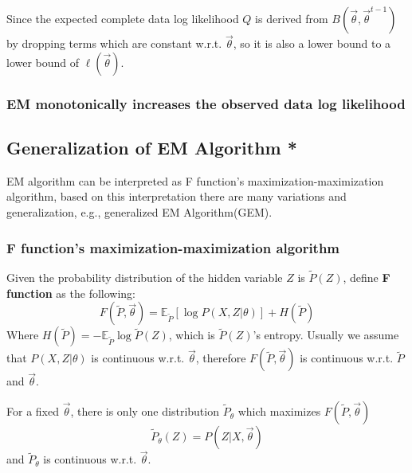 Since the expected complete data log likelihood $Q$ is derived from $B(\vec{\theta},\vec{\theta}^{t-1})$ by dropping terms which are constant w.r.t. $\vec{\theta}$, so it is also a lower bound to a lower bound of $\ell(\vec{\theta})$.


\subsubsection{EM monotonically increases the observed data log likelihood}


\subsection{Generalization of EM Algorithm *}
EM algorithm can be interpreted as F function's maximization-maximization algorithm, based on this interpretation there are many variations and generalization, e.g., generalized EM Algorithm(GEM).


\subsubsection{F function's maximization-maximization algorithm}
\begin{definition}
Given the probability distribution of the hidden variable $Z$ is $\tilde{P}(Z)$, define \textbf{F function} as the following:
\begin{equation}
F(\tilde{P},\vec{\theta})=\mathbb{E}_{\tilde{P}}\left[\log{P(X,Z|\theta)}\right]+H(\tilde{P})
\end{equation}
Where $H(\tilde{P})=-\mathbb{E}_{\tilde{P}}\log\tilde{P}(Z)$, which is $\tilde{P}(Z)$'s entropy. Usually we assume that $P(X,Z|\theta)$ is continuous w.r.t. $\vec{\theta}$, therefore $F(\tilde{P},\vec{\theta})$ is continuous w.r.t. $\tilde{P}$ and $\vec{\theta}$.
\end{definition}

\begin{lemma}
\label{lemma:F-function}
For a fixed $\vec{\theta}$, there is only one distribution $\tilde{P}_{\theta}$ which maximizes $F(\tilde{P},\vec{\theta})$
\begin{equation}
\tilde{P}_{\theta}(Z)=P(Z|X, \vec{\theta})
\end{equation}
and $\tilde{P}_{\theta}$ is continuous w.r.t. $\vec{\theta}$.
\end{lemma}

